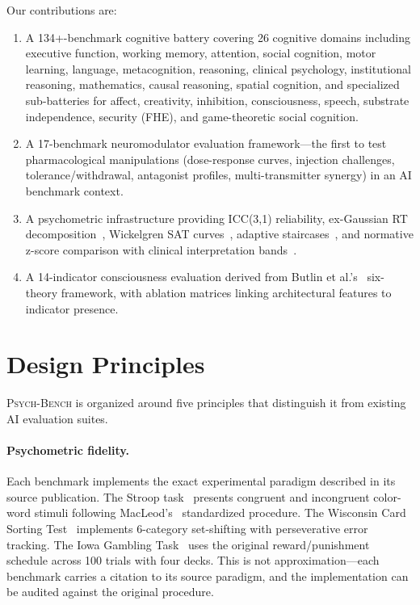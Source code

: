 \documentclass[11pt,letterpaper]{article}
\newcommand{\psychbench}{\textsc{Psych-Bench}}
\begin{document}
Our contributions are:
\begin{enumerate}[nosep]
    \item A 134+-benchmark cognitive battery covering 26 cognitive domains including executive function, working memory, attention, social cognition, motor learning, language, metacognition, reasoning, clinical psychology, institutional reasoning, mathematics, causal reasoning, spatial cognition, and specialized sub-batteries for affect, creativity, inhibition, consciousness, speech, substrate independence, security (FHE), and game-theoretic social cognition.
    \item A 17-benchmark neuromodulator evaluation framework---the first to test pharmacological manipulations (dose-response curves, injection challenges, tolerance/withdrawal, antagonist profiles, multi-transmitter synergy) in an AI benchmark context.
    \item A psychometric infrastructure providing ICC(3,1) reliability, ex-Gaussian RT decomposition~\citep{heathcote1996fitting}, Wickelgren SAT curves~\citep{wickelgren1977speed}, adaptive staircases~\citep{levitt1971transformed}, and normative z-score comparison with clinical interpretation bands~\citep{cicchetti1994guidelines}.
    \item A 14-indicator consciousness evaluation derived from Butlin et al.'s~\citep{butlin2023consciousness} six-theory framework, with ablation matrices linking architectural features to indicator presence.
\end{enumerate}

\section{Design Principles}
\label{sec:principles}

\psychbench{} is organized around five principles that distinguish it from existing AI evaluation suites.

\paragraph{Psychometric fidelity.} Each benchmark implements the exact experimental paradigm described in its source publication. The Stroop task~\citep{stroop1935interference} presents congruent and incongruent color-word stimuli following MacLeod's~\citep{macleod1991half} standardized procedure. The Wisconsin Card Sorting Test~\citep{berg1948simple} implements 6-category set-shifting with perseverative error tracking. The Iowa Gambling Task~\citep{bechara1994insensitivity} uses the original reward/punishment schedule across 100 trials with four decks. This is not approximation---each benchmark carries a citation to its source paradigm, and the implementation can be audited against the original procedure.
\end{document}
